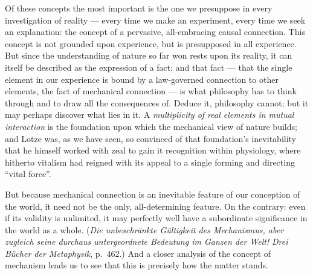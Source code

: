 \documentclass[12pt,a4paper]{book}
\begin{document}
Of these concepts the most important is the one we presuppose in every
investigation of reality --- every time we make an experiment, every time we seek
an explanation: the concept of a pervasive, all-embracing causal connection. This
concept is not grounded upon experience, but is presupposed in all experience.
But since the understanding of nature so far won rests upon its reality, it can
itself be described as the expression of a fact; and that fact --- that the
single element in our experience is bound by a law-governed connection to other
elements, the fact of mechanical connection --- is what philosophy has to think
through and to draw all the consequences of. Deduce it, philosophy cannot; but it
may perhaps discover what lies in it. A \emph{multiplicity of real elements in
mutual interaction} is the foundation upon which the mechanical view of nature
builds; and Lotze was, as we have seen, so convinced of that foundation's
inevitability that he himself worked with zeal to gain it recognition within
physiology, where hitherto vitalism had reigned with its appeal to a single
forming and directing ``vital force''.

But because mechanical connection is an inevitable feature of our conception of
the world, it need not be the only, all-determining feature. On the contrary:
even if its validity is unlimited, it may perfectly well have a subordinate
significance in the world as a whole. (\textit{Die unbeschränkte Gültigkeit des
Mechanismus, aber zugleich seine durchaus untergeordnete Bedeutung im Ganzen der
Welt!} \textit{Drei Bücher der Metaphysik}, p.~462.) And a closer analysis of the
concept of mechanism leads us to see that this is precisely how the matter
stands.
\end{document}

